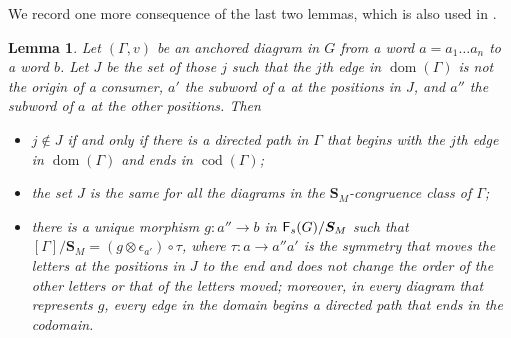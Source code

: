 \documentclass[12pt]{amsart}
\theoremstyle{plain}
\newtheorem{lem}[thm]{Lemma}
\theoremstyle{definition}
\theoremstyle{remark}
\numberwithin{equation}{section}
\theoremstyle{plain}
\DeclareMathOperator{\dom}{dom}
\DeclareMathOperator{\cod}{cod}
\newcommand{\0}{\emptyset}
\newcommand{\fun}{\longrightarrow}
\newcommand{\cat}[1]{\textup{\textsf{#1}}}
\begin{document}
We record one more consequence of the last two lemmas, which is also used in \cite{yinzhang2021}.

\begin{lem}\label{dead:inp}
Let $(\Gamma, v)$ be an anchored diagram in $G$ from a word $a = a_1 \ldots a_n$ to a word $b$. Let $J$ be the set of those $j$ such that the $j$th edge in $\dom(\Gamma)$ is not the origin of a consumer, $a'$ the subword of $a$ at the positions in $J$, and $a''$ the subword of $a$ at the other positions. Then
\begin{itemize}
 \item $j \notin J$ if and only if there is a directed path in $\Gamma$ that begins with the $j$th edge in $\dom(\Gamma)$ and ends in $\cod(\Gamma)$;
 \item the set $J$ is the same for all the diagrams in the $\bm S_M$-congruence class of $\Gamma$;
 \item there is a unique morphism $g : a'' \fun b$ in $\cat F_s(G) / \bm S_M$ such that $[\Gamma] / \bm S_M = (g \otimes \epsilon_{a'}) \circ \tau$, where $\tau : a \fun a''a'$ is the symmetry that moves the letters at the positions in $J$ to the end and does not change the order of the other letters or that of the letters moved; moreover, in every diagram that represents $g$, every edge in the domain begins a directed path that ends in the codomain.
\end{itemize}
\end{lem}
\end{document}
